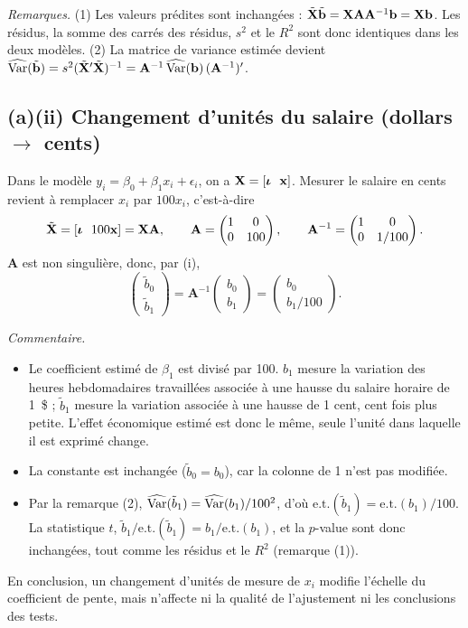 \documentclass[11pt,a4paper]{article}
\newcommand{\vx}{\mathbf{x}}\newcommand{\ve}{\mathbf{e}}\newcommand{\vb}{\mathbf{b}}
\newcommand{\viota}{\bm{\iota}}
\newcommand{\A}{\mathbf{A}}\newcommand{\I}{\mathbf{I}}\newcommand{\W}{\mathbf{W}}
\newcommand{\tX}{\tilde{\mathbf{X}}}
\begin{document}
\textit{Remarques.} (1) Les valeurs prédites sont inchangées : $\tX\tilde{\vb}=\vX\A\A^{-1}\vb=\vX\vb$. Les résidus, la somme des carrés des résidus, $s^2$ et le $R^2$ sont donc identiques dans les deux modèles. (2) La matrice de variance estimée devient $\widehat{\Var}(\tilde{\vb})=s^2(\tX'\tX)^{-1}=\A^{-1}\,\widehat{\Var}(\vb)\,(\A^{-1})'$.

\subsection*{(a)(ii) Changement d'unités du salaire (dollars $\to$ cents)}

Dans le modèle $y_i=\beta_0+\beta_1x_i+\epsilon_i$, on a $\vX=[\viota\ \ \vx]$. Mesurer le salaire en cents revient à remplacer $x_i$ par $100x_i$, c'est-à-dire
\[
\tX=[\viota\ \ 100\vx]=\vX\A,\qquad \A=\begin{pmatrix}1&0\\0&100\end{pmatrix},\qquad \A^{-1}=\begin{pmatrix}1&0\\0&1/100\end{pmatrix}.
\]
$\A$ est non singulière, donc, par (i),
\[
\begin{pmatrix}\tilde b_0\\ \tilde b_1\end{pmatrix}=\A^{-1}\begin{pmatrix}b_0\\ b_1\end{pmatrix}=\begin{pmatrix}b_0\\ b_1/100\end{pmatrix}.
\]

\textit{Commentaire.}
\begin{itemize}[nosep]
\item Le coefficient estimé de $\beta_1$ est divisé par 100. $b_1$ mesure la variation des heures hebdomadaires travaillées associée à une hausse du salaire horaire de 1~\$ ; $\tilde b_1$ mesure la variation associée à une hausse de 1 cent, cent fois plus petite. L'effet économique estimé est donc le même, seule l'unité dans laquelle il est exprimé change.
\item La constante est inchangée ($\tilde b_0=b_0$), car la colonne de 1 n'est pas modifiée.
\item Par la remarque (2), $\widehat{\operatorname{Var}}(\tilde b_1)=\widehat{\operatorname{Var}}(b_1)/100^2$, d'où $\text{e.t.}(\tilde b_1)=\text{e.t.}(b_1)/100$. La statistique $t$, $\tilde b_1/\text{e.t.}(\tilde b_1)=b_1/\text{e.t.}(b_1)$, et la $p$-value sont donc inchangées, tout comme les résidus et le $R^2$ (remarque (1)).
\end{itemize}
En conclusion, un changement d'unités de mesure de $x_i$ modifie l'échelle du coefficient de pente, mais n'affecte ni la qualité de l'ajustement ni les conclusions des tests.
\end{document}
